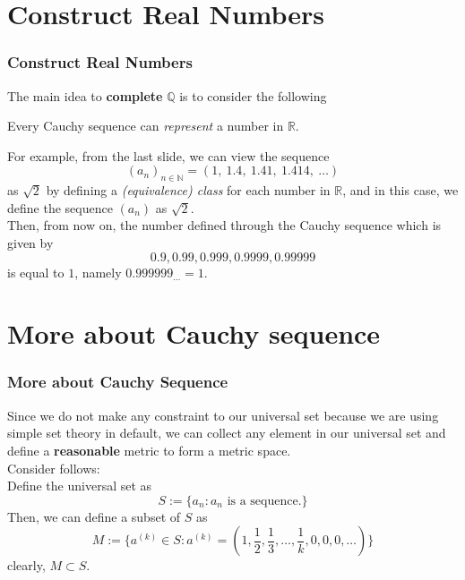 \documentclass[12pt, t]{beamer}
\renewcommand{\emph}[1]{{\color{Turquoise3}\textsl{#1}}}
\begin{document}
\section{Construct Real Numbers}
\begin{frame}
    \frametitle{Construct Real Numbers}
    The main idea to \textbf{complete} $\mathbb{Q}$ is to consider the following\\
    \begin{center}
        Every Cauchy sequence can \emph{represent} a number in $\mathbb{R}$.
    \end{center}

    For example, from the last slide, we can view the sequence
    \begin{equation*}
        (a_n)_{n\in\mathbb{N}}=(1,\ 1.4,\ 1.41,\ 1.414,\ \dots)
    \end{equation*}
    as $\sqrt{2}$ by defining a \emph{(equivalence) class} for each number in $\mathbb{R}$, and in this case, we define the sequence $(a_n)$ as $\sqrt{2}$.\\
    \vspace{0.5em}
    Then, from now on, the number defined through the Cauchy sequence which is given by
    \begin{equation*}
        0.9,0.99,0.999,0.9999,0.99999
    \end{equation*}
    is equal to $1$, namely $0.999999_{\dots}=1$.
\end{frame}

\section{More about Cauchy sequence}
\begin{frame}
    \frametitle{More about Cauchy Sequence}

    Since we do not make any constraint to our universal set because we are using simple set theory in default, we can collect any element in our universal set and define a
    \textbf{reasonable} metric to form a metric space.\\
    \vspace{1em}
    Consider follows:\\
    \hspace{1em} Define the universal set as
    \begin{equation*}
        S:=\{a_n:a_n\text{ is a sequence.}\}
    \end{equation*}
    Then, we can define a subset of $S$ as
    \begin{equation*}
        M:=\{a^{(k)}\in S:a^{(k)}=(1,\frac{1}{2},\frac{1}{3},\dots,\frac{1}{k},0,0,0,\dots)  \}
    \end{equation*}
    clearly, $M\subset S$.

\end{frame}
\end{document}
